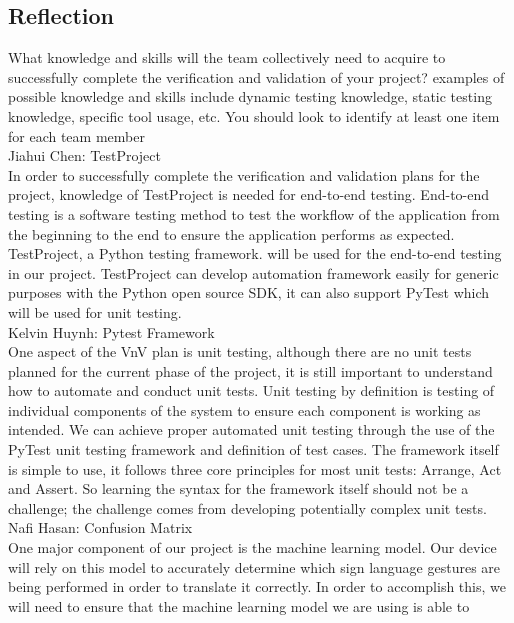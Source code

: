 \documentclass[12pt]{article}
\begin{document}
\subsection{Reflection}
\begin{outline}[enumerate]
  \1 What knowledge and skills will the team collectively need to acquire to successfully complete the verification and validation of your project?
  examples of possible knowledge and skills include dynamic testing knowledge, static testing knowledge, specific tool usage, etc. You should look to
  identify at least one item for each team member\\
    \2 Jiahui Chen: TestProject\\
    In order to successfully complete the verification and validation plans for the project, knowledge of TestProject is needed for end-to-end testing. End-to-end testing 
    is a software testing method to test the workflow of the application from the beginning to the end to ensure the application performs as expected. TestProject, a Python 
    testing framework. will be used for the end-to-end testing in our project. TestProject can develop automation framework easily for generic purposes with the Python open 
    source SDK, it can also support PyTest which will be used for unit testing.\\
    \2 Kelvin Huynh: Pytest Framework\\
    One aspect of the VnV plan is unit testing, although there are no unit tests planned for the current phase of the project, it is still important to understand how to 
    automate and conduct unit tests. Unit testing by definition is testing of individual components of the system to ensure each component is working as intended. We can 
    achieve proper automated unit testing through the use of the PyTest unit testing framework and definition of test cases. The framework itself is simple to use, it follows 
    three core principles for most unit tests: Arrange, Act and Assert. So learning the syntax for the framework itself should not be a challenge; the challenge comes from 
    developing potentially complex unit tests.\\
    \2 Nafi Hasan: Confusion Matrix\\
    One major component of our project is the machine learning model. Our device will rely on this model to accurately determine which sign language gestures are
    being performed in order to translate it correctly. In order to accomplish this, we will need to ensure that the machine learning model we are using is able to 

\end{outline}
\end{document}
